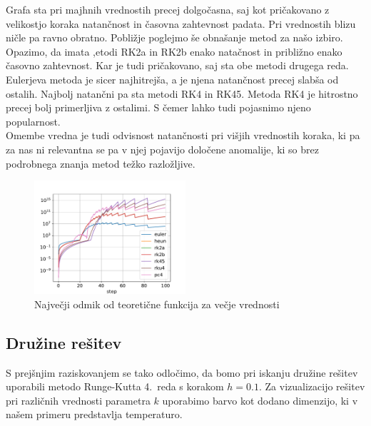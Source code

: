 \documentclass{article}
\begin{document}
Grafa sta pri majhnih vrednostih precej dolgočasna, saj kot pričakovano z velikostjo koraka natančnost in časovna zahtevnost padata. Pri vrednostih blizu ničle pa ravno obratno.
Pobližje poglejmo še obnašanje metod za našo izbiro. Opazimo, da imata ,etodi RK2a in RK2b enako natačnost in približno enako časovno zahtevnost. Kar je tudi pričakovano, saj sta obe metodi drugega reda.
Eulerjeva metoda je sicer najhitrejša, a je njena natančnost precej slabša od ostalih. 
Najbolj natančni pa sta metodi RK4 in RK45. Metoda RK4 je hitrostno precej bolj primerljiva z ostalimi. S čemer lahko tudi pojasnimo njeno popularnost.
\\
Omembe vredna je tudi odvisnost natančnosti pri višjih vrednostih koraka, ki pa za nas ni relevantna se pa v njej pojavijo določene anomalije, ki so brez podrobnega znanja metod težko razložljive.
\begin{figure}[H]
    \centering
    \includegraphics[width=0.5\textwidth]{precisionbig.pdf}
	\caption{Največji odmik od teoretične funkcija za večje vrednosti}

    \label{fig:sample_image}
\end{figure}
\subsection{Družine rešitev}
S prejšnjim raziskovanjem se tako odločimo, da bomo pri iskanju družine rešitev uporabili metodo Runge-Kutta 4.\ reda s korakom $h=0.1$. Za vizualizacijo rešitev pri različnih vrednosti parametra $k$ uporabimo barvo kot dodano dimenzijo, ki v našem primeru predstavlja temperaturo.
\end{document}
